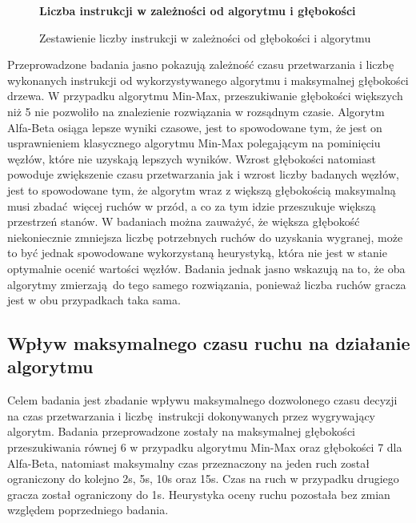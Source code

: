 \documentclass[a4paper,10pt]{article}
\begin{document}
    \begin{figure}[H]
    \begin{center}
        \centering
        \large
        \textbf{Liczba instrukcji w zależności od algorytmu i głębokości}\par\medskip
        \normalsize
        \caption{Zestawienie liczby instrukcji w zależności od głębokości i algorytmu}
    \end{center}
    \end{figure}

    \justify
    Przeprowadzone badania jasno pokazują zależność czasu przetwarzania i liczbę wykonanych instrukcji od wykorzystywanego algorytmu i maksymalnej głębokości drzewa. W przypadku algorytmu Min-Max, przeszukiwanie głębokości większych niż 5 nie pozwoliło na znalezienie rozwiązania w rozsądnym czasie. Algorytm Alfa-Beta osiąga lepsze wyniki czasowe, jest to spowodowane tym, że jest on usprawnieniem klasycznego algorytmu Min-Max polegającym na pominięciu węzłów, które nie uzyskają lepszych wyników. Wzrost głębokości natomiast powoduje zwiększenie czasu przetwarzania jak i wzrost liczby badanych węzłów, jest to spowodowane tym, że algorytm wraz z większą głębokością maksymalną musi zbadać więcej ruchów w przód, a co za tym idzie przeszukuje większą przestrzeń stanów. W badaniach można zauważyć, że większa głębokość niekoniecznie zmniejsza liczbę potrzebnych ruchów do uzyskania wygranej, może to być jednak spowodowane wykorzystaną heurystyką, która nie jest w stanie optymalnie ocenić wartości węzłów. Badania jednak jasno wskazują na to, że oba algorytmy zmierzają do tego samego rozwiązania, ponieważ liczba ruchów gracza jest w obu przypadkach taka sama.
    
    \subsection{Wpływ maksymalnego czasu ruchu na działanie algorytmu}
    Celem badania jest zbadanie wpływu maksymalnego dozwolonego czasu decyzji na czas przetwarzania i liczbę instrukcji dokonywanych przez wygrywający algorytm. Badania przeprowadzone zostały na maksymalnej głębokości przeszukiwania równej 6 w przypadku algorytmu Min-Max oraz głębokości 7 dla Alfa-Beta, natomiast maksymalny czas przeznaczony na jeden ruch został ograniczony do kolejno 2s, 5s, 10s oraz 15s. Czas na ruch w przypadku drugiego gracza został ograniczony do 1s. Heurystyka oceny ruchu pozostała bez zmian względem poprzedniego badania.
    
\end{document}
